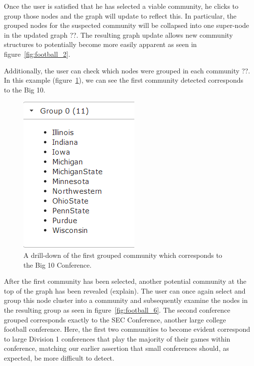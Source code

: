 \documentclass{article}\usepackage[]{graphicx}\usepackage[]{color}
\newcommand{\ak}[1]{{\color{blue} #1}}
\begin{document}
Once the user is satisfied that he has selected a viable community, he clicks to group those nodes and the graph will update to reflect this. In particular, the grouped nodes for the suspected community will be collapsed into one super-node in the updated graph \ak{??}. The resulting graph update allows new community structures to potentially become more easily apparent as seen in figure~\ref{fig:football_2}. 

Additionally, the user can check which nodes were grouped in each community \ak{??}. In this example (figure~\ref{fig:football_5}), we can see the first community detected corresponds to the Big 10.

\begin{figure}[H]
\centering
\includegraphics[scale=.76]{images/football_5.png}
\caption{\label{fig:football_5} A drill-down of the first grouped community which corresponds to the Big 10 Conference.}
\end{figure}

After the first community has been selected, another potential community at the top of the graph has been revealed \ak{(explain)}. The user can once again select and group this node cluster into a community and subsequently examine the nodes in the resulting group as seen in figure~\ref{fig:football_6}. The second conference grouped corresponds exactly to the SEC Conference, another large college football conference. Here, the first two communities to become evident correspond to large Division 1 conferences that play the majority of their games within conference, matching our earlier assertion that small conferences should, as expected, be more difficult to detect.
\end{document}
